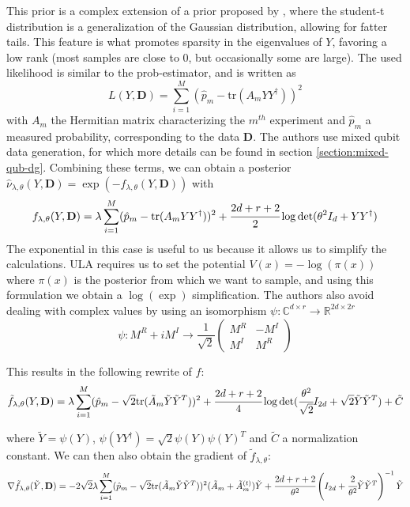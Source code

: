 \documentclass[12pt]{memoir}
\newcommand{\tr}{\text{tr}}
\newcommand{\mb}{\mathbf}
\begin{document}
This prior is a complex extension of a prior proposed by \cite{Dal20}, where the student-t distribution is a generalization of the Gaussian distribution, allowing for fatter tails. This feature is what promotes sparsity in the eigenvalues of $Y$, favoring a low rank (most samples are close to 0, but occasionally some are large).\medbreak
The used likelihood is similar to the prob-estimator, and is written as 
\begin{equation}
L(Y, \mb D) = \sum^{M}_{i=1} (\hat p_m - \tr(A_mYY^\dagger))^2
\end{equation}
with $A_m$ the Hermitian matrix characterizing the $m^{th}$ experiment and $\hat p_m$ a measured probability, corresponding to the data $\mb D$. The authors use mixed qubit data generation, for which more details can be found in section \ref{section:mixed-qub-dg}. \medbreak
Combining these terms, we can obtain a posterior $\hat \nu_{\lambda, \theta}(Y, \mb D) = \exp(-f_{\lambda, \theta}(Y, \mb D))$ with
\begin{equation}
    f_{\lambda, \theta}(Y, \mb D) = \lambda \sum^{M}_{i=1} (\hat p_m - \tr(A_mYY^\dagger))^2 + \cfrac{2d + r + 2}{2}\log \det(\theta^2I_d + YY^\dagger)
\end{equation}
The exponential in this case is useful to us because it allows us to simplify the calculations. ULA requires us to set the potential $V(x) = -\log(\pi(x))$ where $\pi(x)$ is the posterior from which we want to sample, and using this formulation we obtain a $\log(\exp)$ simplification.\medbreak
The authors also avoid dealing with complex values by using an isomorphism $\psi: \mathbb{C}^{d\times r}\rightarrow \mathbb{R}^{2d\times 2r}$
\begin{equation}
\psi: M^R + iM^I \rightarrow \frac{1}{\sqrt 2} \begin{pmatrix}
    M^R & - M^I\\
    M^I & M^R
\end{pmatrix}
\end{equation}

This results in the following rewrite of $f$:
\begin{equation}    
\tilde f_{\lambda, \theta}(Y, \mb D) = \lambda \sum^{M}_{i=1} (\hat p_m - \sqrt{2}\tr(\tilde A_m \tilde Y \tilde Y^{T}))^2 + \cfrac{2d + r + 2}{4}\log \det(\cfrac{\theta^2}{\sqrt 2}I_{2d} + \sqrt 2 \tilde Y \tilde Y^{T}) + \tilde C
\end{equation}

where $\tilde Y = \psi(Y)$, $\psi(YY^\dagger) = \sqrt{2} \psi(Y)\psi(Y)^{T}$ and $\tilde C$ a normalization constant. We can then also obtain the gradient of $\tilde f_{\lambda, \theta}$:
\begin{equation}
\nabla \tilde f_{\lambda, \theta}(\tilde Y, \mb D) = -2\sqrt 2 \lambda \sum^{M}_{i=1} (\hat p_m - \sqrt{2}\tr(\tilde A_m \tilde Y \tilde Y^{T}))^2 (\tilde A_m + \tilde A^{(t)}_m)\tilde Y + \cfrac{2d + r + 2}{\theta^2} \left(I_{2d} + \cfrac{2}{\theta^2}\tilde Y \tilde Y^{T}\right)^{-1} \tilde Y
\end{equation}
\end{document}
